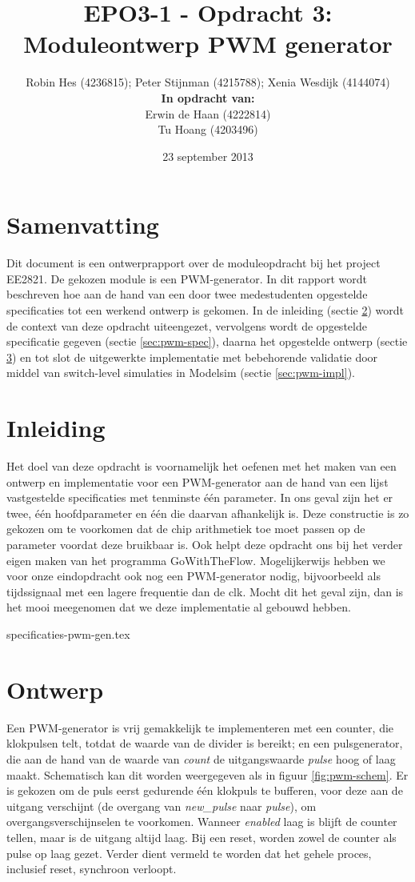 \documentclass{article}
\author{
Robin Hes (4236815); Peter Stijnman (4215788); Xenia Wesdijk (4144074) \\

\textbf{In opdracht van:} \\
Erwin de Haan (4222814) \\
Tu Hoang (4203496) \\
}
\title{EPO3-1 - Opdracht 3: Moduleontwerp PWM generator}
\date{23 september 2013}
\begin{document}
\maketitle
\section{Samenvatting}
Dit document is een ontwerprapport over de moduleopdracht bij het project EE2821. De gekozen module is een PWM-generator.
In dit rapport wordt beschreven hoe aan de hand van een door twee medestudenten opgestelde specificaties tot een werkend ontwerp is gekomen.
In de inleiding (sectie \ref{sec:pwm-inl}) wordt de context van deze opdracht uiteengezet, vervolgens wordt de opgestelde specificatie gegeven (sectie \ref{sec:pwm-spec}), daarna het opgestelde ontwerp (sectie \ref{sec:pwm-ontw}) en tot slot de uitgewerkte implementatie met bebehorende validatie door middel van switch-level simulaties in Modelsim (sectie \ref{sec:pwm-impl}).

\tableofcontents

\section{Inleiding}
\label{sec:pwm-inl}
Het doel van deze opdracht is voornamelijk het oefenen met het maken van een ontwerp en implementatie voor een PWM-generator aan de hand van een lijst vastgestelde specificaties met tenminste één parameter. In ons geval zijn het er twee, één hoofdparameter en één die daarvan afhankelijk is. Deze constructie is zo gekozen om te voorkomen dat de chip arithmetiek toe moet passen op de parameter voordat deze bruikbaar is. Ook helpt deze opdracht ons bij het verder eigen maken van het programma GoWithTheFlow.
Mogelijkerwijs hebben we voor onze eindopdracht ook nog een PWM-generator nodig, bijvoorbeeld als tijdssignaal met een lagere frequentie dan de clk. Mocht dit het geval zijn, dan is het mooi meegenomen dat we deze implementatie al gebouwd hebben.

{specificaties-pwm-gen.tex}

\section{Ontwerp}
\label{sec:pwm-ontw}
Een PWM-generator is vrij gemakkelijk te implementeren met een counter, die klokpulsen telt, totdat de waarde van de divider is bereikt; en een pulsgenerator, die aan de hand van de waarde van \textit{count} de uitgangswaarde \textit{pulse} hoog of laag maakt.
Schematisch kan dit worden weergegeven als in figuur \ref{fig:pwm-schem}. Er is gekozen om de puls eerst gedurende één klokpuls te bufferen, voor deze aan de uitgang verschijnt (de overgang van \textit{new\_pulse} naar \textit{pulse}), om overgangsverschijnselen te voorkomen. Wanneer \textit{enabled} laag is blijft de counter tellen, maar is de uitgang altijd laag. Bij een reset, worden zowel de counter als pulse op laag gezet. Verder dient vermeld te worden dat het gehele proces, inclusief reset, synchroon verloopt.
\end{document}
